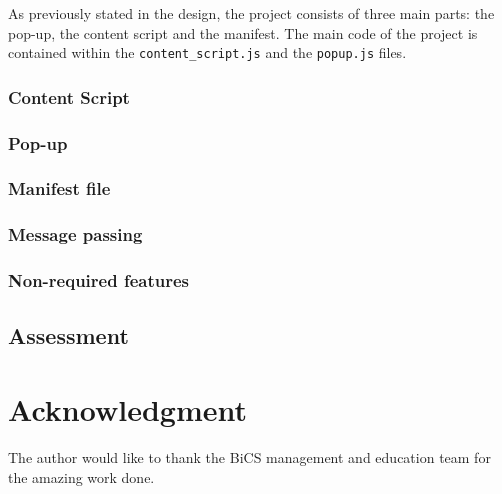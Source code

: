 \documentclass[conference,compsoc]{IEEEtran}
\def\code#1{\texttt{#1}}
\begin{document}
As previously stated in the design, the project consists of three main parts: the pop-up, the content script and the manifest.
The main code of the project is contained within the \code{content\_script.js} and the \code{popup.js} files.


\subsubsection{Content Script}


\subsubsection{Pop-up}


\subsubsection{Manifest file}


\subsubsection{Message passing}


\subsubsection{Non-required features}


\subsection{Assessment}


\section*{Acknowledgment}
The author would like to thank the BiCS management and education team for the amazing work done.
\end{document}
